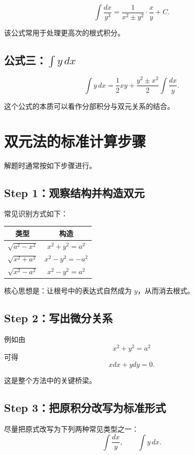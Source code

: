 \documentclass[UTF8,a4paper,12pt]{ctexart}
\begin{document}
\[
  \int \frac{dx}{y^3}=\frac{1}{x^2\pm y^2}\cdot \frac{x}{y} + C.
\]

该公式常用于处理更高次的根式积分。

\subsection{公式三：$\int y\,dx$}

\[
  \int y\,dx=\frac{1}{2}xy+\frac{y^2\pm x^2}{2}\int \frac{dx}{y}.
\]

这个公式的本质可以看作分部积分与双元关系的结合。

\section{双元法的标准计算步骤}

解题时通常按如下步骤进行。

\subsection{Step 1：观察结构并构造双元}

常见识别方式如下：

\begin{center}
  \begin{tabular}{cc}
    \toprule
    类型 & 构造 \\
    \midrule
    $\sqrt{a^2-x^2}$ & $x^2+y^2=a^2$ \\
    $\sqrt{x^2+a^2}$ & $x^2-y^2=-a^2$ \\
    $\sqrt{x^2-a^2}$ & $x^2-y^2=a^2$ \\
    \bottomrule
  \end{tabular}
\end{center}

核心思想是：让根号中的表达式自然成为 $y$，从而消去根式。

\subsection{Step 2：写出微分关系}

例如由
\[
  x^2+y^2=a^2
\]
可得
\[
  xdx+ydy=0.
\]

这是整个方法中的关键桥梁。

\subsection{Step 3：把原积分改写为标准形式}

尽量把原式改写为下列两种常见类型之一：
\[
  \int \frac{dx}{y},\qquad \int y\,dx.
\]
\end{document}
